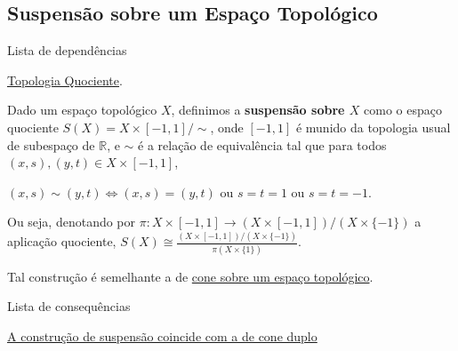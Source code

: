\subsection{Suspensão sobre um Espaço Topológico}
\label{suspensao-def}
\begin{titlemize}{Lista de dependências}
	\item \hyperref[topologia-quociente-def]{Topologia Quociente}.
\end{titlemize}
\begin{defi}[Suspensão]
	Dado um espaço topológico $X$, definimos a \textbf{suspensão sobre $X$} como o espaço quociente $S(X) = X\times [-1,1]/\sim$, onde $[-1,1]$ é munido da topologia usual de subespaço de $\mathbb{R}$, e $\sim$ é a relação de equivalência tal que para todos $(x,s),(y,t) \in X\times [-1,1]$,\\
    \centerline{
    $(x,s)\sim(y,t) \Leftrightarrow (x,s)=(y,t)$ ou $s=t=1$ ou $s=t=-1$.}
\end{defi}
Ou seja, denotando por $\pi:X\times [-1,1]\to (X\times [-1,1])/(X\times \{-1\})$ a aplicação quociente, $\displaystyle S(X) \cong \frac{(X\times [-1,1])/(X\times \{-1\})}{\pi(X\times \{1\})}$.

Tal construção é semelhante a de \hyperref[cone-def]{cone sobre um espaço topológico}.

\begin{titlemize}{Lista de consequências}
	\item \hyperref[suspensao-cone-duplo-prop]{A construção de suspensão coincide com a de cone duplo}
\end{titlemize}